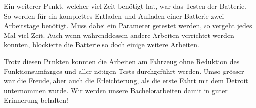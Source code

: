 Ein weiterer Punkt, welcher viel Zeit benötigt hat, war das Testen der Batterie. So werden für ein komplettes Entladen und Aufladen einer Batterie zwei Arbeitstage benötigt. Muss dabei ein Parameter getestet werden, so vergeht jedes Mal viel Zeit. Auch wenn währenddessen andere Arbeiten verrichtet werden konnten, blockierte die Batterie so doch einige weitere Arbeiten.

Trotz diesen Punkten konnten die Arbeiten am Fahrzeug ohne Reduktion des Funktionsumfanges und aller nötigen Tests durchgeführt werden. Umso grösser war die Freude, aber auch die Erleichterung, als die erste Fahrt mit dem Detroit unternommen wurde. Wir werden unsere Bachelorarbeiten damit in guter Erinnerung behalten!